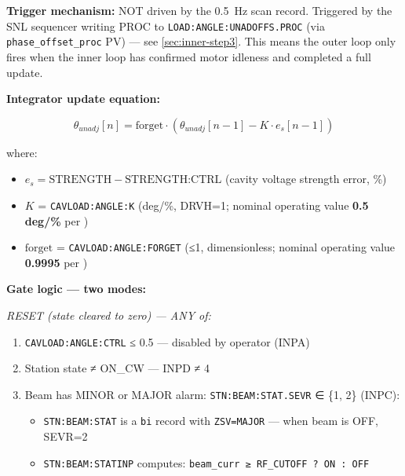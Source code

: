 \textbf{Trigger mechanism:} NOT driven by the \qty{0.5}{\hertz} scan record. Triggered by the SNL sequencer writing PROC to \texttt{LOAD:\allowbreak{}ANGLE:\allowbreak{}UNADOFFS.\allowbreak{}PROC} (via \texttt{phase\_\allowbreak{}offset\_\allowbreak{}proc} PV) --- see \cref{sec:inner-step3}. This means the outer loop only fires when the inner loop has confirmed motor idleness and completed a full update.

\textbf{Integrator update equation:}

\begin{equation}\label{eq:integrator}
  \theta_{unadj}[n] = \text{forget} \cdot \left( \theta_{unadj}[n-1] - K \cdot e_s[n-1] \right)
\end{equation}

where:

\begin{itemize}
\tightlist
\item
  \(e_s = \text{STRENGTH} - \text{STRENGTH:CTRL}\) (cavity voltage strength error, \%)
\item
  \(K\) = \texttt{CAVLOAD:\allowbreak{}ANGLE:\allowbreak{}K} (deg/\%, DRVH=1; nominal operating value \textbf{0.5 deg/\%} per )
\item
  \(\text{forget}\) = \texttt{CAVLOAD:\allowbreak{}ANGLE:\allowbreak{}FORGET} (≤1, dimensionless; nominal operating value \textbf{0.9995} per )
\end{itemize}

\textbf{Gate logic --- two modes:}

\emph{RESET (state cleared to zero) --- ANY of:}

\begin{enumerate}
\def\labelenumi{\arabic{enumi}.}
\tightlist
\item
  \texttt{CAVLOAD:\allowbreak{}ANGLE:\allowbreak{}CTRL} ≤ 0.5 --- disabled by operator (INPA)
\item
  Station state ≠ ON\_CW --- INPD ≠ 4
\item
  Beam has MINOR or MAJOR alarm: \texttt{STN:\allowbreak{}BEAM:\allowbreak{}STAT.\allowbreak{}SEVR} ∈ \{1, 2\} (INPC):

  \begin{itemize}
  \tightlist
  \item
    \texttt{STN:BEAM:STAT} is a \texttt{bi} record with \texttt{ZSV=MAJOR} --- when beam is OFF, SEVR=2
  \item
    \texttt{STN:\allowbreak{}BEAM:\allowbreak{}STATINP} computes: \texttt{beam\_\allowbreak{}curr\ ≥\ RF\_\allowbreak{}CUTOFF\ ?\ ON\ :\allowbreak{}\ OFF}
  \end{itemize}
\end{enumerate}

